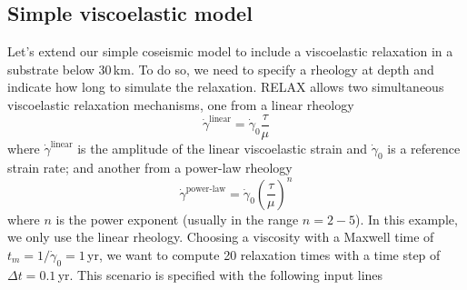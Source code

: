 \documentclass[10pt]{article}
\begin{document}
\subsection{Simple viscoelastic model}

Let's extend our simple coseismic model to include a viscoelastic relaxation in a substrate below 30\,km. To do so, we need to specify a rheology at depth and indicate how long to simulate the relaxation. RELAX allows two simultaneous viscoelastic relaxation mechanisms, one from a linear rheology
\begin{equation}
\dot{\gamma}^{\text{linear}}=\dot{\gamma}_0\frac{\tau}{\mu}
\end{equation}
where $\dot{\gamma}^{\text{linear}}$ is the amplitude of the linear viscoelastic strain and $\dot{\gamma}_0$ is a reference strain rate; and another from a power-law rheology
\begin{equation}
\dot{\gamma}^{\text{power-law}}=\dot{\gamma}_0\left(\frac{\tau}{\mu}\right)^{n}
\end{equation}
where $n$ is the power exponent (usually in the range $n=2-5$). In this example, we only use the linear rheology. Choosing a viscosity with a Maxwell time of $t_m=1/\dot{\gamma}_0=1$\,yr, we want to compute 20 relaxation times with a time step of $\Delta t=0.1\,$yr. This scenario is specified with the following input lines
\end{document}
